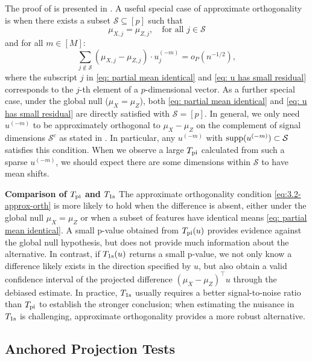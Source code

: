 \documentclass[11pt]{article}
\begin{document}
The proof of  is presented in .
A useful special case of approximate orthogonality is when there exists a subset $\mathcal S\subseteq[p]$ such that
\begin{equation}\label{eq: partial mean identical}
        \mu_{X,j} = \mu_{Z,j},\quad\text{for all 
 }j\in \mathcal{S}
    \end{equation} and for all $m\in[M]$:
    \begin{equation}\label{eq: u has small residual}
        \sum_{j \notin \mathcal{S}}\left(\mu_{X,j}-\mu_{Z,j}\right) \cdot u^{(-m)}_j=o_P(n^{-1/2}),
    \end{equation}
where the subscript $j$ in \eqref{eq: partial mean identical} and \eqref{eq: u has small residual} corresponds to the $j$-th element of a $p$-dimensional vector.  As a further special case, under the global null ($\mu_X=\mu_Z$), both \eqref{eq: partial mean identical} and \eqref{eq: u has small residual} are directly satisfied with $\mathcal S=[p]$. In general, we only need $u^{(-m)}$ to be approximately orthogonal to $\mu_X - \mu_Z$ on the complement 
 of signal dimensions $\mathcal{S}^c$ as stated in . In particular, any $u^{(-m)}$ with ${\rm supp}(u^{(-m)}) \subset \mathcal{S}$ satisfies this condition. When we observe a large $T_{\rm pi}$ calculated from such a sparse $u^{(-m)}$, we should expect there are some dimensions within $\mathcal{S}$ to have mean shifts.

\textbf{Comparison of $T_{\rm pi}$ and $T_{\rm 1s}$}
The approximate orthogonality condition \eqref{eq:3.2-approx-orth} is more likely to hold when the difference is absent, either under the global null $\mu_X=\mu_Z$ or when a subset of features have identical means \eqref{eq: partial mean identical}. A small p-value obtained from $T_{\rm pi}(u)$ provides evidence against the global null hypothesis, but does not provide much information about the alternative. In contrast, if $T_{\rm 1s}(u)$ returns a small p-value, we not only know a difference likely exists in the direction specified by $u$, but also obtain a valid confidence interval of the projected difference $(\mu_X - \mu_Z)^\top u$ through the debiased estimate. In practice, $T_{\rm 1s}$ usually requires a better signal-to-noise ratio than $T_{\rm pi}$ to establish the stronger conclusion; when estimating the nuisance in $T_{\rm 1s}$ is challenging, approximate orthogonality provides a more robust alternative. 

\subsection{Anchored Projection Tests}
\label{section: anchored lasso}
\end{document}

